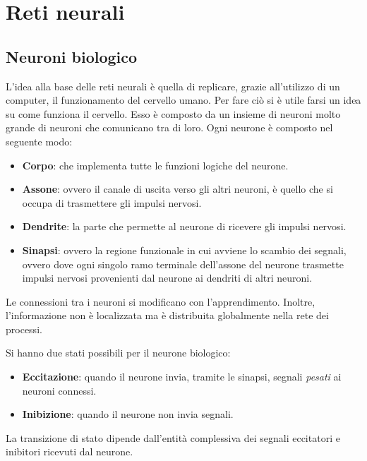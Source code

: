 \chapter{Reti neurali}
\section{Neuroni biologico}
L'idea alla base delle reti neurali è quella di replicare, grazie all'utilizzo
di un computer, il funzionamento del cervello umano. Per fare ciò si è utile
farsi un idea su come funziona il cervello. Esso è composto da un insieme di
neuroni molto grande di neuroni che comunicano tra di loro. Ogni neurone è composto
nel seguente modo:
\begin{itemize}
    \item \textbf{Corpo}: che implementa tutte le funzioni logiche del neurone.
    \item \textbf{Assone}: ovvero il canale di uscita verso gli altri neuroni,
          è quello che si occupa di trasmettere gli impulsi nervosi.
    \item \textbf{Dendrite}: la parte che permette al neurone di ricevere gli
          impulsi nervosi.
    \item \textbf{Sinapsi}: ovvero la regione funzionale in cui avviene lo scambio
          dei segnali, ovvero dove ogni singolo ramo terminale dell'assone del neurone
          trasmette impulsi nervosi provenienti dal neurone ai dendriti di altri neuroni.
\end{itemize}

Le connessioni tra i neuroni si modificano con l'apprendimento. Inoltre,
l'informazione non è localizzata ma è distribuita globalmente nella rete dei processi.

Si hanno due stati possibili per il neurone biologico:
\begin{itemize}
    \item \textbf{Eccitazione}: quando il neurone invia, tramite le sinapsi,
          segnali \textit{pesati} ai neuroni connessi.
    \item \textbf{Inibizione}: quando il neurone non invia segnali.
\end{itemize}

La transizione di stato dipende dall'entità complessiva dei segnali eccitatori e
inibitori ricevuti dal neurone.
